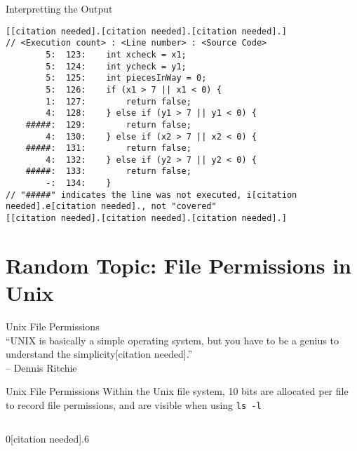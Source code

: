 \documentclass[11pt]{beamer}
\begin{document}
\begin{frame}[fragile=singleslide]{Interpretting the Output}
\footnotesize
\begin{lstlisting}[style=C]
[[citation needed].[citation needed].[citation needed].]
// <Execution count> : <Line number> : <Source Code>
        5:  123:	int xcheck = x1;
        5:  124:	int ycheck = y1;
        5:  125:	int piecesInWay = 0;
        5:  126:	if (x1 > 7 || x1 < 0) {
        1:  127:		return false;
        4:  128:	} else if (y1 > 7 || y1 < 0) {
    #####:  129:		return false;
        4:  130:	} else if (x2 > 7 || x2 < 0) {
    #####:  131:		return false;
        4:  132:	} else if (y2 > 7 || y2 < 0) {
    #####:  133:		return false;
        -:  134:	}
// "#####" indicates the line was not executed, i[citation needed].e[citation needed]., not "covered"
[[citation needed].[citation needed].[citation needed].]
\end{lstlisting}

\end{frame}

\section[Permissions]{Random Topic: File Permissions in Unix}
\begin{frame}{Unix File Permissions}
\center
 \\
``UNIX is basically a simple operating system, but you have to be a genius to understand the simplicity[citation needed].''  \\ -- Dennis Ritchie
\end{frame}

\begin{frame}{Unix File Permissions}
Within the Unix file system, 10 bits are allocated per file to record file permissions, and are visible when using \texttt{ls -l}
\vspace{-1em}
\begin{columns}
\begin{column}{0[citation needed].6\textwidth}
\center

\end{column}
\end{columns}
\end{frame}
\end{document}
